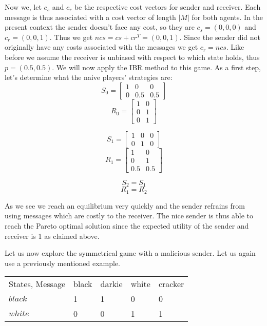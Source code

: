 \documentclass{article}
\begin{document}
Now we, let $c_s$ and $c_r$ be the respective cost vectors for sender and receiver. Each message is thus associated with a cost vector of length $|M|$ for both agents. In the present context the sender doesn't face any cost, so they are $c_s=(0,0,0)$ and $c_r=(0,0,1)$. Thus we get $ncs=cs + cr^T=(0,0,1)$. Since the sender did not originally have any costs associated with the messages we get $c_r=ncs$. Like before we assume the receiver is unbiased with respect to which state holds, thus $p=(0.5,0.5)$.
We will now apply the IBR method to this game. As a first step, let's determine what the naive players' strategies are:\\
\begin{equation*}
S_0=
\begin{bmatrix}
1 & 0 & 0\\
0 & 0.5 & 0.5
\end{bmatrix}
\end{equation*}
\begin{equation*}
R_0=
\begin{bmatrix}
1 & 0\\
0 & 1\\
0 & 1
\end{bmatrix}
\end{equation*}

\begin{equation*}
S_1=
\begin{bmatrix}
1 & 0 & 0\\
0 & 1 & 0
\end{bmatrix}
\end{equation*}
\begin{equation*}
R_1=
\begin{bmatrix}
1 & 0\\
0 & 1\\
0.5 & 0.5
\end{bmatrix}
\end{equation*}

\begin{equation*}
S_2=S_1
\end{equation*}
\begin{equation*}
R_1=R_2
\end{equation*}

As we see we reach an equilibrium very quickly and the sender refrains from using messages which are costly to the receiver. The nice sender is thus able to reach the Pareto optimal solution since the expected utility of the sender and receiver is 1 as claimed above.

Let us now explore the symmetrical game with a malicious sender. Let us again use a previously mentioned example.
\begin{table}[h]
\centering
\begin{tabular}{lllll}
States, Message & black & darkie & white & cracker \\
$black$  & 1      & 1    & 0        & 0   \\
$white$  & 0     & 0   & 1       & 1
\end{tabular}
\end{table}
\end{document}
